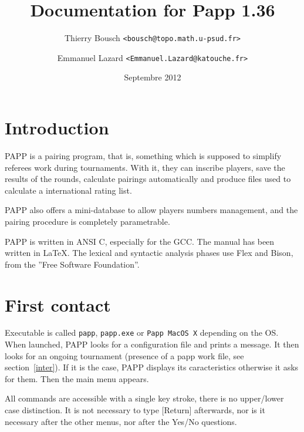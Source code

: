 \documentclass[10pt]{article}
\newif\iftth
\begin{document}
\title{\huge\bf Documentation for Papp 1.36}
\author{ {Thierry Bousch {\tt <bousch@topo.math.u-psud.fr>}}
\and {Emmanuel Lazard {\tt <Emmanuel.Lazard@katouche.fr>}}
}
\date{Septembre 2012}
\maketitle

\iftth   
{\begin{html}<small>Si les math&#233;matiques de ce document sont
        bizarres, changez l'encodage (MacRoman ou ISO-8859-1) dans 
        votre navigateur. Et si le probl&#232;me persite, vous devriez 
        trouver une solution ici : http ://hutchinson.belmont.ma.us/tth/manual/ </small>
 \end{html}} 
\else {}
\fi    


\section{Introduction}

	PAPP is a pairing program, that is, something which is supposed to 
simplify referees work during tournaments.  With it, they can 
inscribe players, save the results of the rounds, calculate pairings 
automatically and produce files used to calculate a international 
rating list.

	PAPP also offers a mini-database to allow players numbers 
management, and the pairing procedure is completely parametrable.

	PAPP is written in ANSI C, especially for the GCC. The manual has 
been written in \LaTeX. The lexical and syntactic analysis phases use 
Flex and Bison, from the ''Free Software Foundation''.

\section{First contact}

Executable is called \verb|papp|, \verb|papp.exe| or \verb|Papp MacOS X| depending on the OS. When launched, PAPP looks for a configuration file and prints a message. It then looks for an ongoing tournament (presence of a papp work file, see section~\ref{inter}). If it is the case, PAPP
displays its caracteristics otherwise it asks for them. Then the main menu appears.

	All commands are accessible with a single key stroke, there is no upper/lower case distinction. 
It is not  necessary to type [Return] afterwards, nor is it necessary after the 
other menus, nor after the Yes/No questions.
\end{document}
